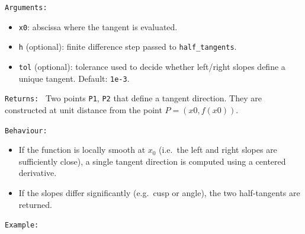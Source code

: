 \medskip

\texttt{Arguments: }
\begin{itemize}
\item \texttt{x0}: abscissa where the tangent is evaluated.
\item \texttt{h} (optional): finite difference step passed to \texttt{half\_tangents}.
\item \texttt{tol} (optional): tolerance used to decide whether left/right slopes
define a unique tangent. Default: \texttt{1e-3}.
\end{itemize}

\medskip

\texttt{Returns: }
Two points \texttt{P1}, \texttt{P2} that define a tangent direction.
They are constructed at unit distance from the point $P=(x0,f(x0))$.

\medskip

\texttt{Behaviour: }

\begin{itemize}
  \item If the function is locally smooth at $x_0$
        (i.e.\ the left and right slopes are sufficiently close),
        a single tangent direction is computed using a centered derivative.
  \item If the slopes differ significantly (e.g.\ cusp or angle),
        the two half-tangents are returned.
\end{itemize}

\medskip

\texttt{Example: }

\begin{tkzexample}[vbox]

\begin{center}
\end{center}

\end{tkzexample}


